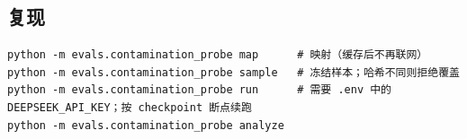\documentclass[
  10pt,
]{ctexart}
\begin{document}
\subsection{复现}\label{ux590dux73b0}

\begin{Verbatim}[breaklines=true,breakanywhere=true]
python -m evals.contamination_probe map      # 映射（缓存后不再联网）
python -m evals.contamination_probe sample   # 冻结样本；哈希不同则拒绝覆盖
python -m evals.contamination_probe run      # 需要 .env 中的 DEEPSEEK_API_KEY；按 checkpoint 断点续跑
python -m evals.contamination_probe analyze
\end{Verbatim}
\end{document}
